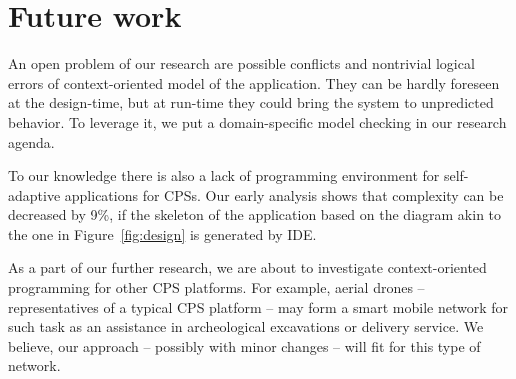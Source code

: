 \section{Future work}

An open problem of our research are possible conflicts and nontrivial logical
errors of context-oriented model of the application. They can be hardly foreseen
at the design-time, but at run-time they could bring the system to unpredicted
behavior. To leverage it, we put a domain-specific model checking in our
research agenda.

To our knowledge there is also a lack of programming environment for
self-adaptive applications for CPSs. Our early analysis shows that complexity
can be decreased by 9\%, if the skeleton of the application based on the diagram
akin to the one in Figure~\ref{fig:design} is generated by IDE.

As a part of our further research, we are about to investigate context-oriented
programming for other CPS platforms. For example, aerial drones --
representatives of a typical CPS platform -- may form a smart mobile network for
such task as an assistance in archeological excavations or delivery service. We
believe, our approach -- possibly with minor changes -- will fit for this type of
network.

